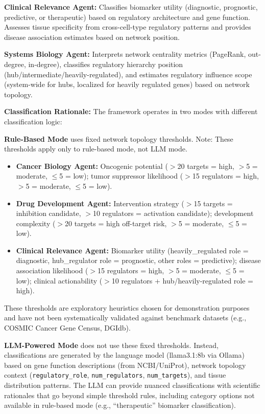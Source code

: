 \documentclass[11pt]{article}
\begin{document}
\textbf{Clinical Relevance Agent:} Classifies biomarker utility (diagnostic, prognostic, predictive, or therapeutic) based on regulatory architecture and gene function. Assesses tissue specificity from cross-cell-type regulatory patterns and provides disease association estimates based on network position.

\textbf{Systems Biology Agent:} Interprets network centrality metrics (PageRank, out-degree, in-degree), classifies regulatory hierarchy position (hub/intermediate/heavily-regulated), and estimates regulatory influence scope (system-wide for hubs, localized for heavily regulated genes) based on network topology.

\textbf{Classification Rationale:} The framework operates in two modes with different classification logic:

\textbf{Rule-Based Mode} uses fixed network topology thresholds. Note: These thresholds apply only to rule-based mode, not LLM mode.

\begin{itemize}
\item \textbf{Cancer Biology Agent:} Oncogenic potential ($>$20 targets = high, $>$5 = moderate, $\leq$5 = low); tumor suppressor likelihood ($>$15 regulators = high, $>$5 = moderate, $\leq$5 = low).
\item \textbf{Drug Development Agent:} Intervention strategy ($>$15 targets = inhibition candidate, $>$10 regulators = activation candidate); development complexity ($>$20 targets = high off-target risk, $>$5 = moderate, $\leq$5 = low).
\item \textbf{Clinical Relevance Agent:} Biomarker utility (heavily\_regulated role = diagnostic, hub\_regulator role = prognostic, other roles = predictive); disease association likelihood ($>$15 regulators = high, $>$5 = moderate, $\leq$5 = low); clinical actionability ($>$10 regulators + hub/heavily-regulated role = high).
\end{itemize}

These thresholds are exploratory heuristics chosen for demonstration purposes and have not been systematically validated against benchmark datasets (e.g., COSMIC Cancer Gene Census, DGIdb).

\textbf{LLM-Powered Mode} does not use these fixed thresholds. Instead, classifications are generated by the language model (llama3.1:8b via Ollama) based on gene function descriptions (from NCBI/UniProt), network topology context (\texttt{regulatory\_role}, \texttt{num\_regulators}, \texttt{num\_targets}), and tissue distribution patterns. The LLM can provide nuanced classifications with scientific rationales that go beyond simple threshold rules, including category options not available in rule-based mode (e.g., ``therapeutic'' biomarker classification).
\end{document}
